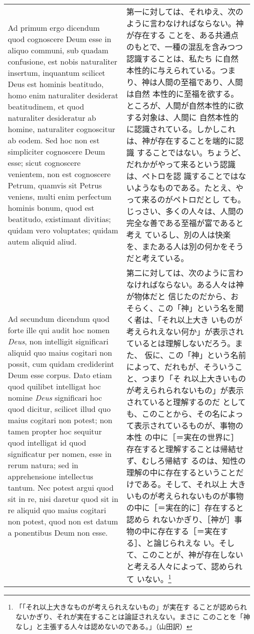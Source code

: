\documentclass[10pt]{jsarticle}
\begin{document}
\begin{longtable}{p{21em}p{21em}}
\\

{\sc Ad primum ergo dicendum} quod cognoscere Deum esse in aliquo
communi, sub quadam confusione, est nobis naturaliter insertum,
inquantum scilicet Deus est hominis beatitudo, homo enim naturaliter
desiderat beatitudinem, et quod naturaliter desideratur ab homine,
naturaliter cognoscitur ab eodem. Sed hoc non est simpliciter
cognoscere Deum esse; sicut cognoscere venientem, non est cognoscere
Petrum, quamvis sit Petrus veniens, multi enim perfectum hominis
bonum, quod est beatitudo, existimant divitias; quidam vero
voluptates; quidam autem aliquid aliud.

&

第一に対しては、それゆえ、次のように言わなければならない。神が存在する
ことを、ある共通点のもとで、一種の混乱を含みつつ認識することは、私たち
に自然本性的に与えられている。つまり、神は人間の至福であり、人間は自然
本性的に至福を欲する。ところが、人間が自然本性的に欲する対象は、人間に
自然本性的に認識されている。しかしこれは、神が存在することを端的に認識
することではない。ちょうど、だれかがやって来るという認識は、ペトロを認
識することではないようなものである。たとえ、やって来るのがペトロだとし
ても。じっさい、多くの人々は、人間の完全な善である至福が富であると考え
ているし、別の人は快楽を、またある人は別の何かをそうだと考えている。

\\

{\sc Ad secundum dicendum} quod forte ille qui audit hoc nomen {\it
Deus}, non intelligit significari aliquid quo maius cogitari non
possit, cum quidam crediderint Deum esse corpus. Dato etiam quod
quilibet intelligat hoc nomine {\it Deus} significari hoc quod
dicitur, scilicet illud quo maius cogitari non potest; non tamen
propter hoc sequitur quod intelligat id quod significatur per nomen,
esse in rerum natura; sed in apprehensione intellectus tantum. Nec
potest argui quod sit in re, nisi daretur quod sit in re aliquid quo
maius cogitari non potest, quod non est datum a ponentibus Deum non
esse.

 &

第二に対しては、次のように言わなければならない。ある人々は神が物体だと
信じたのだから、おそらく、この「神」という名を聞く者は、「それ以上大き
いものが考えられえない何か」が表示されているとは理解しないだろう。また、
仮に、この「神」という名前によって、だれもが、そういうこと、つまり「そ
れ以上大きいものが考えられられないもの」が表示されていると理解するのだ
としても、このことから、その名によって表示されているものが、事物の本性
の中に［＝実在の世界に］存在すると理解することは帰結せず、むしろ帰結す
るのは、知性の理解の中に存在するということだけである。そして、それ以上
大きいものが考えられないものが事物の中に［＝実在的に］存在すると認めら
れないかぎり、［神が］事物の中に存在する［＝実在する］、と論じられえな
い。そして、このことが、神が存在しないと考える人々によって、認められて
いない。\footnote{「「それ以上大きなものが考えられえないもの」が実在す
ることが認められないかぎり、それが実在することは論証されえない。まさに
このことを「神なし」と主張する人々は認めないのである。」（山田訳）}


\end{longtable}
\end{document}
